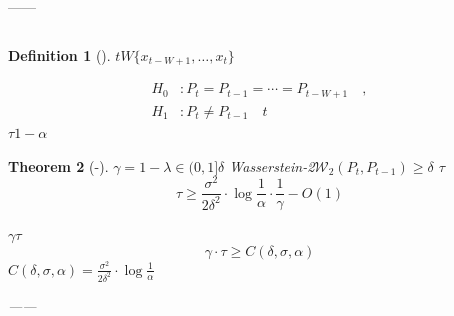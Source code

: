 \documentclass[11pt,a4paper]{article}
\newtheorem{theorem}{Theorem}[section]
\newtheorem{definition}[theorem]{Definition}
\theoremstyle{remark}
\begin{document}
\textbf{}——\textbf{}



\subsection{}

\begin{definition}[]\label{def:shift_detection}
$t$$W$$\{x_{t-W+1}, \ldots, x_t\}$

\begin{align}
    H_0 &: P_t = P_{t-1} = \cdots = P_{t-W+1} \quad\text{}, \\
    H_1 &: P_t \neq P_{t-1} \quad\text{$t$}
\end{align}
\textbf{}$\tau$$1-\alpha$

\end{definition}

\begin{theorem}[-]\label{thm:pareto}
$\gamma = 1-\lambda \in (0, 1]$$\delta$
Wasserstein-2$\mathcal{W}_2(P_t, P_{t-1}) \geq \delta$
$\tau$
\begin{equation}
    \tau \geq \frac{\sigma^2}{2\delta^2} \cdot \log\frac{1}{\alpha} \cdot \frac{1}{\gamma} - O(1)
\end{equation}

$\gamma$$\tau$\textbf{}
\begin{equation}
    \boxed{
    \gamma \cdot \tau \geq C(\delta, \sigma, \alpha)
    }
\end{equation}
$C(\delta, \sigma, \alpha) = \frac{\sigma^2}{2\delta^2} \cdot \log\frac{1}{\alpha}$

\textbf{}
——
\end{theorem}

\subsection{}
\end{document}
